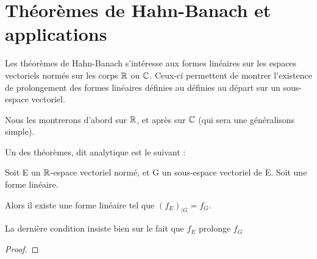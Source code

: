 \section{Théorèmes de Hahn-Banach et applications}

Les théorèmes de Hahn-Banach s'intéresse aux formes linéaires sur les espaces
vectoriels normés sur les corps $\mathbb{R}$ ou $\mathbb{C}$.
Ceux-ci permettent de montrer l'existence de prolongement des formes linéaires
définies au définies au départ sur un sous-espace vectoriel.

Nous les montrerons d'abord sur $\mathbb{R}$, et après sur $\mathbb{C}$ (qui sera une
généralisons simple).

Un des théorèmes, dit analytique est le suivant :

\begin{theorem} 
	Soit E un $\mathbb{R}$-espace vectoriel normé, et G un sous-espace vectoriel de E.
	Soit  une forme linéaire.

	Alors il existe une forme linéaire  tel que
	$(f_{E})_{|G} = f_{G}$.
\end{theorem}

La dernière condition insiste bien sur le fait que $f_{E}$ prolonge $f_{G}$

\begin{proof}
	
\end{proof}


